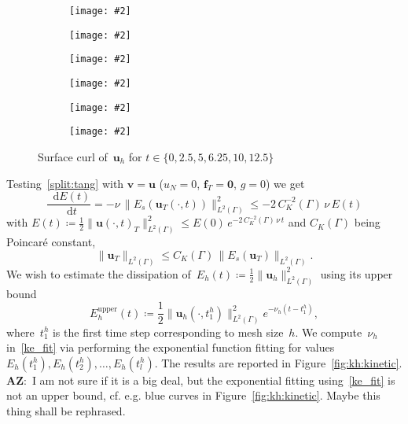 \documentclass[12pt]{article}
\newcommand{\includegraphicsw}[2][1.]{\texttt{[image: \#2]}}
\newcommand{\vect}[1]{\boldsymbol{\mathbf{#1}}}
\newcommand*\diff{\mathop{}\!\mathrm{d}}
\newcommand{\LTwoSpace}[1][\Gamma]{{L^2\left({#1}\right)}}
\newcommand{\AZ}[1]{{\color{red}\textbf{AZ}:~#1}}
\begin{document}
\begin{figure}[H]
	\centering
	\begin{subfigure}{.33\linewidth}
		\includegraphicsw[.9]{{kh_t=0.cropped}.png}
	\end{subfigure}%
	\begin{subfigure}{.33\linewidth}
		\includegraphicsw[.9]{{kh_t=2.5.cropped}.png}
	\end{subfigure}%
	\begin{subfigure}{.33\linewidth}
		\includegraphicsw[.9]{{kh_t=5.cropped}.png}
	\end{subfigure}%
	\par\bigskip
	\begin{subfigure}{.33\linewidth}
		\includegraphicsw[.9]{{kh_t=6.25.cropped}.png}
	\end{subfigure}%
	\begin{subfigure}{.33\linewidth}
		\includegraphicsw[.9]{{kh_t=10.cropped}.png}
	\end{subfigure}%
	\begin{subfigure}{.33\linewidth}
		\includegraphicsw[.9]{{kh_t=12.5.cropped}.png}
	\end{subfigure}%
	\caption{Surface curl of~$\vect u_h$ for $t \in \{ 0, 2.5, 5, 6.25, 10, 12.5 \}$}
	\label{fig:kh:curl}		
\end{figure}

Testing~\eqref{split:tang} with $\vect v = \vect u$ ($u_N = 0$, $\vect f_T = \vect 0$, $g = 0$) we get
\begin{equation}
	\frac{\diff{E(t)}}{\diff{t}} = -\nu\,\|E_s(\vect u_T(\cdot, t))\|^2_{\LTwoSpace} \le -2\,C_K^{-2}(\Gamma)\,\nu\,E(t)
\end{equation}
with $E(t) \coloneqq \frac 12 \|\vect u(\cdot, t)_T\|^2_{\LTwoSpace} \le E(0)\,e^{-2\,C_K^{-2}(\Gamma)\,\nu\,t}$ and $C_K(\Gamma)$ being Poincar\'{e} constant, $$\|\vect u_T\|_{\LTwoSpace} \le C_K(\Gamma)\,\|E_s(\vect u_T)\|_{\LTwoSpace}.$$
We wish to estimate the dissipation of~$E_h(t) \coloneqq \frac 12 \|\vect u_h\|^2_{\LTwoSpace}$ using its upper bound
\begin{equation}\label{ke_fit}
	E_h^\text{upper}(t) \coloneqq \frac 12 \|\vect u_h(\cdot, t_1^h)\|^2_{\LTwoSpace} e^{-\nu_h(t - t_1^h)},
\end{equation}
where~$t_1^h$ is the first time step corresponding to mesh size~$h$. We compute~$\nu_h$ in~\eqref{ke_fit} via performing the exponential function fitting for values~$E_h(t_1^h), E_h(t_2^h), \dots, E_h(t_l^h)$. The results are reported in Figure~\ref{fig:kh:kinetic}. \AZ{I am not sure if it is a big deal, but the exponential fitting using~\eqref{ke_fit} is not an upper bound, cf. e.g. blue curves in Figure~\ref{fig:kh:kinetic}. Maybe this thing shall be rephrased.}
\end{document}
